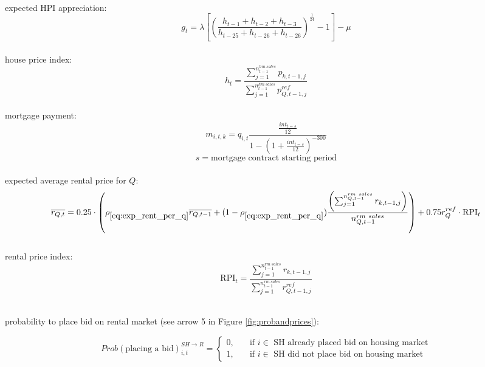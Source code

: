 \documentclass[]{article}
\begin{document}
\\
expected HPI appreciation:
\begin{equation} \label{eq:HPI_expected}
g_{t} = \lambda \left[\left(\frac{h_{t-1} + h_{t-2} + h_{t-3}}
		{h_{t-25} + h_{t-26} + h_{t-26}}\right)^{\frac{1}{24}} - 1 \right] - \mu 
\end{equation}
\\
house price index:
\begin{equation} \label{eq:hpi}
	h_{t}=\frac{\sum_{j=1}^{n^{hm\ sales}_{t-1}}p_{k,t-1,j}}{\sum_{j=1}^{n^{hm\ sales}_{t-1}}p^{ref}_{Q,t-1,j}}
\end{equation}
\\
mortgage payment:
\begin{equation} \label{eq:m_SH}
m_{i,t,k}= q_{i,t} \frac{\frac{int_{t=s}}{12}}{1-(1+\frac{int_{t=s}}{12})^{-300}}
\end{equation}
\begin{equation*}
	s = \text{mortgage contract starting period}
\end{equation*}
\\
expected average rental price for $Q$:
\begin{equation}\label{eq:exp_rent_per_q}
\overline{r_{Q, t}}= 0.25\cdot \left(\rho_{\eqref{eq:exp_rent_per_q}} \overline{r_{Q, t-1}} + (1 - \rho_{\eqref{eq:exp_rent_per_q}})\frac{\left(\sum_{j=1}^{n^{rm\ sales}_{Q, t-1}}{r_{k, t-1, j}}\right)}{n^{rm\ sales}_{Q, t-1}}\right) + 0.75 r^{ref}_{Q} \cdot \text{RPI}_{t}
\end{equation}
\\
rental price index:
\begin{equation} \label{eq:RPI}
\text{RPI}_{t}=\frac{\sum_{j=1}^{n^{rm\ sales}_{t-1}}r_{k,t-1,j}}{\sum_{j=1}^{n^{rm\ sales}_{t-1}}r^{ref}_{Q,t-1,j}}
\end{equation}
\\
\begin{flushleft}
probability to place bid on rental market (see arrow 5 in Figure \ref{fig:probandprices}):
\end{flushleft}
\begin{equation} \label{eq:prob_rent}
	Prob(\text{placing a bid})^{SH \rightarrow R}_{i,t} =
	\begin{cases}
	0, \quad &\text{if $i \in$ SH already placed bid on housing market} \\
	1, \quad &\text{if $i \in$ SH did not place bid on housing market} 
	\end{cases}
\end{equation}
\\
\end{document}
